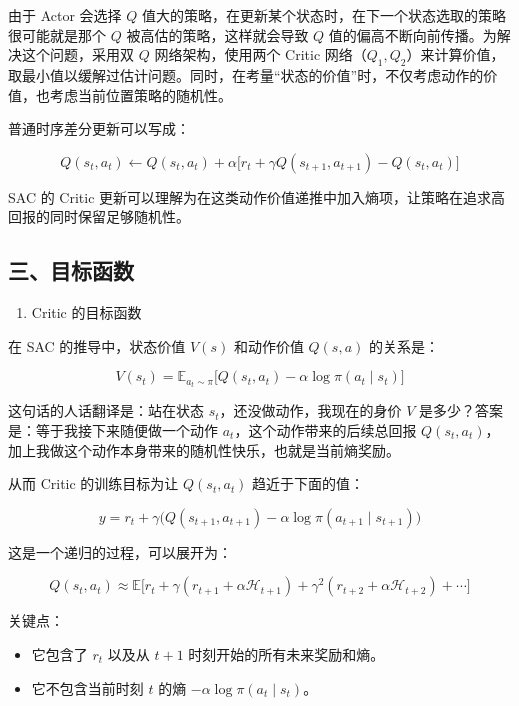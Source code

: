 由于 Actor 会选择 \(Q\) 值大的策略，在更新某个状态时，在下一个状态选取的策略很可能就是那个 \(Q\) 被高估的策略，这样就会导致 \(Q\) 值的偏高不断向前传播。为解决这个问题，采用双 \(Q\) 网络架构，使用两个 Critic 网络（\(Q_1,Q_2\)）来计算价值，取最小值以缓解过估计问题。同时，在考量``状态的价值''时，不仅考虑动作的价值，也考虑当前位置策略的随机性。

普通时序差分更新可以写成：

\[
Q(s_t,a_t)
\leftarrow
Q(s_t,a_t)
+
\alpha
\bigl[
r_t+\gamma Q(s_{t+1},a_{t+1})-Q(s_t,a_t)
\bigr]
\]

SAC 的 Critic 更新可以理解为在这类动作价值递推中加入熵项，让策略在追求高回报的同时保留足够随机性。

\hypertarget{ux4e09ux76eeux6807ux51fdux6570}{%
\subsection{三、目标函数}\label{ux4e09ux76eeux6807ux51fdux6570}}

\begin{enumerate}
\def\labelenumi{\arabic{enumi}.}
\tightlist
\item
  Critic 的目标函数
\end{enumerate}

在 SAC 的推导中，状态价值 \(V(s)\) 和动作价值 \(Q(s,a)\) 的关系是：

\[
V(s_t)
=
\mathbb{E}_{a_t\sim\pi}
\bigl[
Q(s_t,a_t)
-
\alpha\log\pi(a_t\mid s_t)
\bigr]
\]

这句话的人话翻译是：站在状态 \(s_t\)，还没做动作，我现在的身价 \(V\) 是多少？答案是：等于我接下来随便做一个动作 \(a_t\)，这个动作带来的后续总回报 \(Q(s_t,a_t)\)，加上我做这个动作本身带来的随机性快乐，也就是当前熵奖励。

从而 Critic 的训练目标为让 \(Q(s_t,a_t)\) 趋近于下面的值：

\[
y
=
r_t
+
\gamma
\bigl(
Q(s_{t+1},a_{t+1})
-
\alpha\log\pi(a_{t+1}\mid s_{t+1})
\bigr)
\]

这是一个递归的过程，可以展开为：

\[
Q(s_t,a_t)
\approx
\mathbb{E}
\bigl[
r_t
+
\gamma(r_{t+1}+\alpha\mathcal{H}_{t+1})
+
\gamma^{2}(r_{t+2}+\alpha\mathcal{H}_{t+2})
+
\cdots
\bigr]
\]

关键点：

\begin{itemize}
\tightlist
\item
  它包含了 \(r_t\) 以及从 \(t+1\) 时刻开始的所有未来奖励和熵。
\item
  它不包含当前时刻 \(t\) 的熵 \(-\alpha\log\pi(a_t\mid s_t)\)。
\end{itemize}


